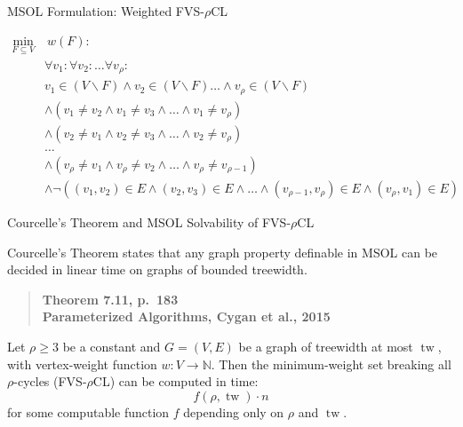 \documentclass{beamer}
\newcommand{\tw}{\operatorname{tw}}
\begin{document}
\begin{frame}{MSOL Formulation: Weighted FVS-$\rho$CL}

\begin{equation}
    \label{courcelle:rho}
    \begin{aligned}
        \min_{F \subseteq V} & \ w(F) : \\
        & \forall v_1 : \forall v_2 : \dots \forall v_{\rho} : \\
        & v_1 \in (V \backslash F) \land v_2 \in (V \backslash F) \dots \land v_{\rho} \in (V \backslash F) \\
        & \land (v_1 \neq v_2 \land v_1 \neq v_3 \land \dots \land v_1 \neq v_{\rho}) \\
        & \land (v_2 \neq v_1 \land v_2 \neq v_3 \land \dots \land v_2 \neq v_{\rho}) \\
        & \dots \\
        & \land (v_{\rho} \neq v_1 \land v_{\rho} \neq v_2 \land \dots \land v_{\rho} \neq v_{\rho-1}) \\
        & \land \neg((v_1, v_2) \in E \land (v_2, v_3) \in E \land \dots \land (v_{\rho-1},v_{\rho}) \in E \land (v_{\rho}, v_1) \in E)
    \end{aligned}
\end{equation}

\end{frame}

\begin{frame}{Courcelle's Theorem and MSOL Solvability of FVS-$\rho$CL}

Courcelle's Theorem states that any graph property definable in MSOL can be decided in linear time on graphs of bounded treewidth.

\begin{quote}
\hfill \textbf{Theorem 7.11, p.~183} \\
\hfill \textbf{Parameterized Algorithms, Cygan et al., 2015}
\end{quote}

\begin{corollary}
\label{cor:msol-fvs-rho}
Let $\rho \ge 3$ be a constant and $G = (V,E)$ be a graph of treewidth at most $\tw$, with vertex-weight function $w : V \to \mathbb{N}$.
Then the minimum-weight set breaking all $\rho$-cycles (FVS-$\rho$CL) can be computed in time:
\[
    f(\rho, \tw) \cdot n
\]
for some computable function $f$ depending only on $\rho$ and $\tw$.
\end{corollary}


\end{frame}
\end{document}
